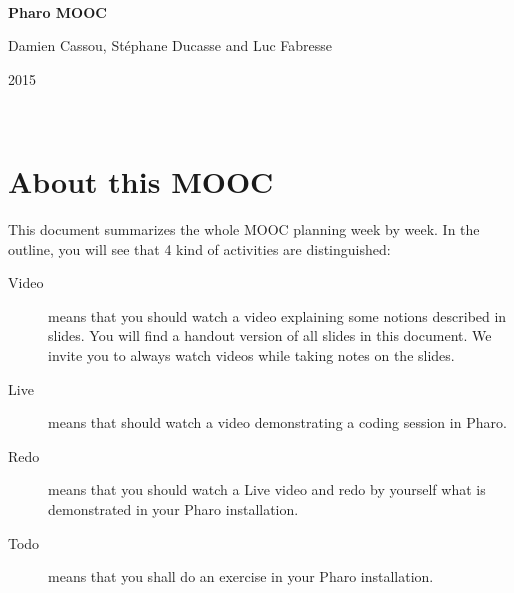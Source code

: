 \documentclass[a4paper,11pt,final]{book}
\newenvironment{shadowblock}[1]%
{\begin{tcolorbox}[width=#1]}
{\end{tcolorbox}}
\begin{document}

\thispagestyle{empty}
\begin{center}
	\vspace*{1em}

	~\vfill %
	
	\begin{shadowblock}{\linewidth}
		\centering
		\begin{minipage}{\linewidth}
		\noindent\vspace*{1em}
		\begin{center}
		\textbf{\Huge Pharo MOOC}
		
		\vspace*{3.5em}
	
		{\LARGE Damien Cassou, Stéphane Ducasse and Luc Fabresse}
      
      \vspace*{2em}
      
      2015\\  
      \vspace*{0.5em}
	\end{center}    
	 
      \vspace*{1em}
	\end{minipage}
	\end{shadowblock}
\end{center}

~\vfill %

\newpage

\chapter*{About this MOOC}

This document summarizes the whole MOOC planning week by week.
In the outline, you will see that 4 kind of activities are distinguished:

\begin{description}
\item[Video] means that you should watch a video explaining some notions described in slides.
You will find a handout version of all slides in this document. 
We invite you to always watch videos while taking notes on the slides.

\item[Live] means that should watch a video demonstrating a coding session in Pharo. 

\item[Redo] means that you should watch a Live video and redo by yourself what is demonstrated in your Pharo installation.

\item[Todo] means that you shall do an exercise in your Pharo installation.

\end{description}
\end{document}
